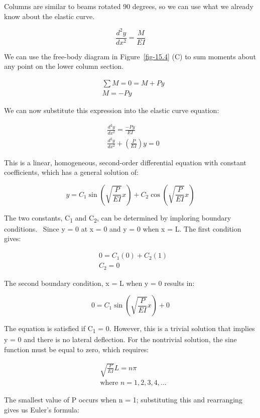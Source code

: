 \documentclass[
  letterpaper,
  DIV=11,
  numbers=noendperiod]{scrreprt}
\theoremstyle{definition}
\theoremstyle{remark}
\begin{document}
Columns are similar to beams rotated 90 degrees, so we can use what we
already know about the elastic curve.

\[
\frac{d^2 y}{d x^2}=\frac{M}{E I}
\]

We can use the free-body diagram in Figure~\ref{fig-15.4} (C) to sum
moments about any point on the lower column section.

\[
\begin{aligned}
& \sum M=0=M+P y \\
& M=-P y
\end{aligned}
\]

We can now substitute this expression into the elastic curve equation:

\[
\begin{aligned}
& \frac{d^2 y}{d x^2}=\frac{-P y}{E I} \\
& \frac{d^2 y}{d x^2}+\left(\frac{P}{E I}\right) y=0
\end{aligned}
\]

This is a linear, homogeneous, second-order differential equation with
constant coefficients, which has a general solution of:

\[
y=C_1 \sin \left(\sqrt{\frac{P}{E I}} x\right)+C_2 \cos \left(\sqrt{\frac{P}{E I}} x\right)
\]

The two constants, C\textsubscript{1} and C\textsubscript{2}, can be
determined by imploring boundary conditions.~ Since y = 0 at x = 0 and y
= 0 when x = L. The first condition gives:

\[
\begin{aligned}
&0  =C_1(0)+C_2(1) \\
& C_2  =0
\end{aligned}
\]

The second boundary condition, x = L when y = 0 results in:

\[
0=C_1 \sin \left(\sqrt{\frac{P}{E I}} x\right)+0
\]

The equation is satisfied if C\textsubscript{1} = 0. However, this is a
trivial solution that implies y = 0 and there is no lateral deflection.
For the nontrivial solution, the sine function must be equal to zero,
which requires:

\[
\begin{aligned}
&\sqrt{\frac{P}{E I}} L=n \pi \\
& \text {where } n=1, 2, 3, 4,...
\end{aligned}
\]

The smallest value of P occurs when n = 1; substituting this and
rearranging gives us Euler's formula:
\end{document}

